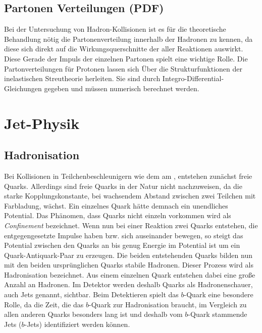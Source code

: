 \subsection{Partonen Verteilungen (PDF)}
Bei der Untersuchung von Hadron-Kollisionen ist es für die theoretische Behandlung nötig die Partonenverteilung innerhalb der Hadronen zu kennen, da diese sich direkt auf die Wirkungsquerschnitte der aller Reaktionen auswirkt. Diese Gerade der Impuls der einzelnen Partonen spielt eine wichtige Rolle. Die Partonverteilungen für Protonen lassen sich Über die Strukturfunktionen der inelastischen Streutheorie herleiten\cite{halzen2008quark}. Sie sind durch Integro-Differential-Gleichungen gegeben und müssen numerisch berechnet werden. 


\section{Jet-Physik}
\subsection{Hadronisation}
Bei Kollisionen in Teilchenbeschleunigern wie dem \lhc am \cern, entstehen zunächst freie Quarks. Allerdings sind freie Quarks in der Natur nicht nachzuweisen, da die starke Kopplungskonstante, bei wachsendem Abstand zwischen zwei Teilchen mit Farbladung, wächst. Ein einzelnes Quark hätte demnach ein unendliches Potential. Das Phänomen, dass Quarks nicht einzeln vorkommen wird als \emph{Confinement} bezeichnet. Wenn nun bei einer Reaktion zwei Quarks entstehen, die entgegengesetzte Impulse haben bzw. sich auseinander bewegen, so steigt das Potential zwischen den Quarks an bis genug Energie im Potential ist um ein Quark-Antiquark-Paar zu erzeugen\cite{Artru1983147}. Die beiden entstehenden Quarks bilden nun mit den beiden ursprünglichen Quarks stabile Hadronen. Dieser Prozess wird als Hadronisation bezeichnet. Aus einem einzelnen Quark entstehen dabei eine große Anzahl an Hadronen. Im Detektor werden deshalb Quarks als Hadronenschauer, auch Jets genannt, sichtbar. Beim Detektieren spielt das $b$-Quark eine besondere Rolle, da die Zeit, die das $b$-Quark zur Hadronisation braucht, im Vergleich zu allen anderen Quarks besonders lang ist und deshalb vom $b$-Quark stammende Jets ($b$-Jets) identifiziert werden können.
